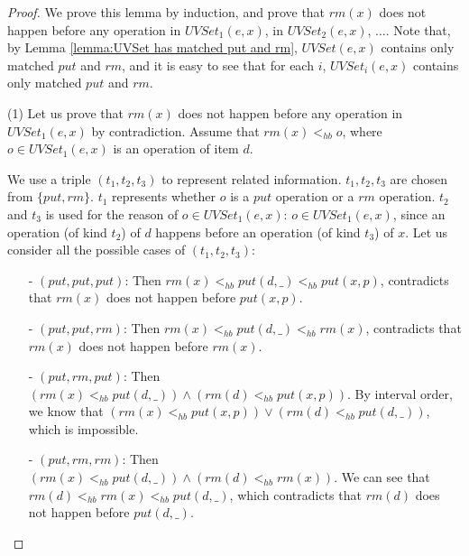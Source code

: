 \begin {proof}

We prove this lemma by induction, and prove that $\textit{rm}(x)$ does not happen before any operation in $\textit{UVSet}_1(e,x)$, in $\textit{UVSet}_2(e,x)$, $\ldots$. Note that, by Lemma \ref{lemma:UVSet has matched put and rm}, $\textit{UVSet}(e,x)$ contains only matched $\textit{put}$ and $\textit{rm}$, and it is easy to see that for each $i$, $\textit{UVSet}_i(e,x)$ contains only matched $\textit{put}$ and $\textit{rm}$.

\noindent (1) Let us prove that $\textit{rm}(x)$ does not happen before any operation in $\textit{UVSet}_1(e,x)$ by contradiction. Assume that $\textit{rm}(x) <_{hb} o$, where $o \in \textit{UVSet}_1(e,x)$ is an operation of item $d$. 

We use a triple $(t_1,t_2,t_3)$ to represent related information. $t_1,t_2,t_3$ are chosen from $\{ \textit{put},\textit{rm} \}$. $t_1$ represents whether $o$ is a $\textit{put}$ operation or a $\textit{rm}$ operation. $t_2$ and $t_3$ is used for the reason of $o \in \textit{UVSet}_1(e,x)$: $o \in \textit{UVSet}_1(e,x)$, since an operation (of kind $t_2$) of $d$ happens before an operation (of kind $t_3$) of $x$. Let us consider all the possible cases of $(t_1,t_2,t_3)$:

\begin{itemize}
\setlength{\itemsep}{0.5pt}
\item[-] $(\textit{put},\textit{put},\textit{put})$: Then $\textit{rm}(x) <_{hb} \textit{put}(d,\_) <_{hb} \textit{put}(x,p)$, contradicts that $\textit{rm}(x)$ does not happen before $\textit{put}(x,p)$.

\item[-] $(\textit{put},\textit{put},\textit{rm})$: Then $\textit{rm}(x) <_{hb} \textit{put}(d,\_) <_{hb} \textit{rm}(x)$, contradicts that $\textit{rm}(x)$ does not happen before $\textit{rm}(x)$.

\item[-] $(\textit{put},\textit{rm},\textit{put})$: Then $( \textit{rm}(x) <_{hb} \textit{put}(d,\_) ) \wedge ( \textit{rm}(d) <_{hb} \textit{put}(x,p) )$. By interval order, we know that $( \textit{rm}(x) <_{hb} \textit{put}(x,p) ) \vee ( \textit{rm}(d) <_{hb} \textit{put}(d,\_) )$, which is impossible.

\item[-] $(\textit{put},\textit{rm},\textit{rm})$: Then $( \textit{rm}(x) <_{hb} \textit{put}(d,\_) ) \wedge ( \textit{rm}(d) <_{hb} \textit{rm}(x) )$. We can see that $\textit{rm}(d) <_{hb} \textit{rm}(x) <_{hb} \textit{put}(d,\_)$, which contradicts that $\textit{rm}(d)$ does not happen before $\textit{put}(d,\_)$.


\end{itemize}
\end{proof}
